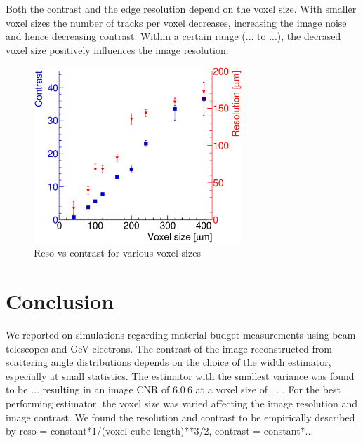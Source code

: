 \documentclass{PoS}
\begin{document}
Both the contrast and the edge resolution depend on the voxel size. 
With smaller voxel sizes the number of tracks per voxel decreases, increasing the image noise and hence decreasing contrast.
Within a certain range (... to ...), the decrased voxel size positively influences the image resolution. 

\begin{figure}[t!]
  \centering
  \includegraphics[width=0.70\textwidth]{figures/CRvsVS.eps}
    \caption[contrast]{%
    Reso vs contrast for various voxel sizes}
  \label{fig:resovscontrast}
\end{figure}





\section{Conclusion}

We reported on simulations regarding material budget measurements using beam telescopes and GeV electrons. 
The contrast of the image reconstructed from scattering angle distributions depends on the choice of the width estimator, especially at small statistics. 
The estimator with the smallest variance was found to be ... resulting in an image CNR of $\SI{6.0}{6}$  at a voxel size of ... . %
For the best performing estimator, the voxel size was varied affecting the image resolution and image contrast. 
We found the resolution and contrast to be empirically described by reso = constant*1/(voxel cube length)**3/2, contrast = constant*...






\end{document}
